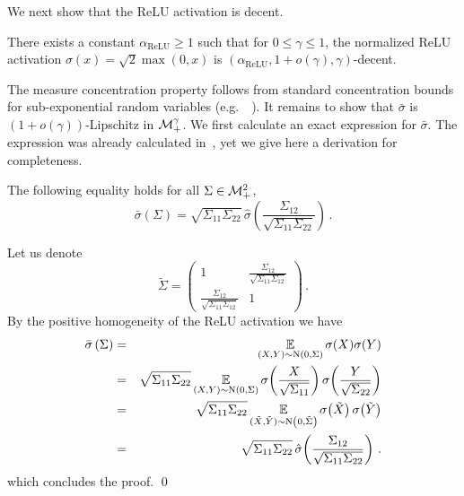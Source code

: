 \medskip
We next show that the ReLU activation is decent.
\begin{lemma}\label{lem:relu_is_decent}
%
There exists a constant $\alpha_\mathrm{ReLU}\ge 1$ such that for
$0\le \gamma\le 1$, the normalized ReLU activation
$\sigma(x)=\sqrt{2}\max(0,x)$ is
$(\alpha_\mathrm{ReLU},1+o(\gamma),\gamma)$-decent.
\end{lemma}
\proof
The measure concentration property follows from standard concentration
bounds for sub-exponential random variables (e.g.\ ~\cite{shalev2014understanding}).  It
remains to show that $\bar\sigma$ is $(1+o(\gamma))$-Lipschitz in
${\cal M}^\gamma_+$. We first calculate an exact expression for $\bar\sigma$.
The expression was already calculated in~\cite{cho2009kernel}, yet we give
here a derivation for completeness.
%
\begin{claim}\label{claim:relu_dual_ext}
The following equality holds for all $\Sigma\in{\cal M}_{+}^2$,
$$\bar\sigma(\Sigma) = \sqrt{\Sigma_{11}\Sigma_{22}} \,
	\hat\sigma\!\left(\frac{\Sigma_{12}}{\sqrt{\Sigma_{11}\Sigma_{22}}}\right)
\,. $$
\end{claim}
\proof Let us denote
$$\tilde{\Sigma} = \begin{pmatrix}
1 & \frac{\Sigma_{12}}{\sqrt{\Sigma_{11}\Sigma_{12}}} \\
\frac{\Sigma_{12}}{\sqrt{\Sigma_{11}\Sigma_{12}}} & 1
\end{pmatrix} \,. $$
By the positive homogeneity of the ReLU activation we have
\begin{eqnarray*}
\bar\sigma\left(\Sigma\right) &=&
	\operatorname*{\mathbb{E}}_{(X,Y)\sim\text{N}(0,\Sigma)}\sigma(X)\sigma(Y) \\
&=& \sqrt{\Sigma_{11}\Sigma_{22}}
		\operatorname*{\mathbb{E}}_{(X,Y)\sim\text{N}(0,\Sigma)}
			\sigma\!\left(\frac{X}{\sqrt{\Sigma_{11}}}\right)
			\sigma\!\left(\frac{Y}{\sqrt{\Sigma_{22}}}\right) \\
&=& \sqrt{\Sigma_{11}\Sigma_{22}}
			\operatorname*{\mathbb{E}}_{(\tilde{X},\tilde{Y})\sim\text{N}\left(0,\tilde{\Sigma}\right)}
			\sigma\!\left(\tilde{X}\right)\sigma\!\left(\tilde{Y}\right) \\
&=& \sqrt{\Sigma_{11}\Sigma_{22}}\,
	\hat{\sigma}\!\left(\frac{\Sigma_{12}}{\sqrt{\Sigma_{11}\Sigma_{22}}}\right)
	\, .
\end{eqnarray*}
which concludes the proof. \qed

\medskip

